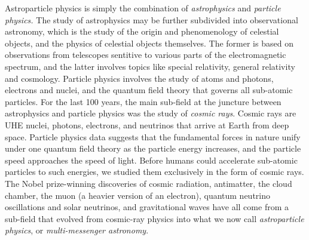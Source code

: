 \documentclass[../../main.tex]{subfiles}
\begin{document}
Astroparticle physics is simply the combination of \textit{astrophysics} and \textit{particle physics.}  The study of astrophysics may be further subdivided into observational astronomy, which is the study of the origin and phenomenology of celestial objects, and the physics of celestial objects themselves.  The former is based on observations from telescopes sentitive to various parts of the electromagnetic spectrum, and the latter involves topics like special relativity, general relativity and cosmology.  Particle physics involves the study of atoms and photons, electrons and nuclei, and the quantum field theory that governs all sub-atomic particles.  For the last 100 years, the main sub-field at the juncture between astrophysics and particle physics was the study of \textit{cosmic rays}.  Cosmic rays are UHE nuclei, photons, electrons, and neutrinos that arrive at Earth from deep space.  Particle physics data suggests that the fundamental forces in nature unify under one quantum field theory as the particle energy increases, and the particle speed approaches the speed of light.  Before humans could accelerate sub-atomic particles to such energies, we studied them exclusively in the form of cosmic rays.  The Nobel prize-winning discoveries of cosmic radiation, antimatter, the cloud chamber, the muon (a heavier version of an electron), quantum neutrino oscillations and solar neutrinos, and gravitational waves have all come from a sub-field that evolved from cosmic-ray physics into what we now call \textit{astroparticle physics}, or \textit{multi-messenger astronomy}. \\ \hspace{0.1cm}
\end{document}
